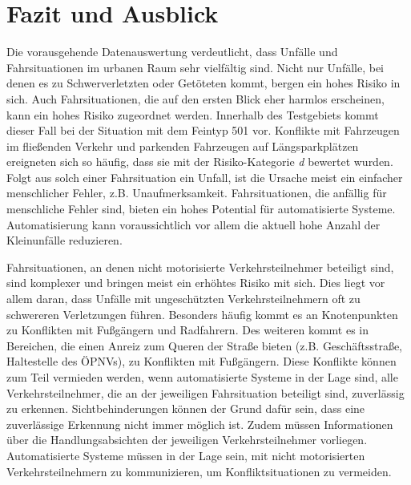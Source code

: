 
\chapter{Fazit und Ausblick}\label{chapter:Diskussion}
Die vorausgehende Datenauswertung verdeutlicht, dass Unfälle und Fahrsituationen im urbanen Raum sehr vielfältig sind. Nicht nur Unfälle, bei denen es zu Schwerverletzten oder Getöteten kommt, bergen ein hohes Risiko in sich. Auch Fahrsituationen, die auf den ersten Blick eher harmlos erscheinen, kann ein hohes Risiko zugeordnet werden. Innerhalb des Testgebiets kommt dieser Fall bei der Situation mit dem Feintyp 501 vor. Konflikte mit Fahrzeugen im fließenden Verkehr und parkenden Fahrzeugen auf Längsparkplätzen ereigneten sich so häufig, dass sie mit der Risiko-Kategorie \textit{d} bewertet wurden. Folgt aus solch einer Fahrsituation ein Unfall, ist die Ursache meist ein einfacher menschlicher Fehler, z.B. Unaufmerksamkeit. Fahrsituationen, die anfällig für menschliche Fehler sind, bieten ein hohes Potential für automatisierte Systeme. Automatisierung kann voraussichtlich vor allem die aktuell hohe Anzahl der Kleinunfälle reduzieren.

Fahrsituationen, an denen nicht motorisierte Verkehrsteilnehmer beteiligt sind, sind komplexer und bringen meist ein erhöhtes Risiko mit sich. Dies liegt vor allem daran, dass Unfälle mit ungeschützten Verkehrsteilnehmern oft zu schwereren Verletzungen führen. Besonders häufig kommt es an Knotenpunkten zu Konflikten mit Fußgängern und Radfahrern. Des weiteren kommt es in Bereichen, die einen Anreiz zum Queren der Straße bieten (z.B. Geschäftsstraße, Haltestelle des ÖPNVs), zu Konflikten mit Fußgängern. Diese Konflikte können zum Teil vermieden werden, wenn automatisierte Systeme in der Lage sind, alle Verkehrsteilnehmer, die an der jeweiligen Fahrsituation beteiligt sind, zuverlässig zu erkennen. Sichtbehinderungen können der Grund dafür sein, dass eine zuverlässige Erkennung nicht immer möglich ist. Zudem müssen Informationen über die Handlungsabsichten der jeweiligen Verkehrsteilnehmer vorliegen. Automatisierte Systeme müssen in der Lage sein, mit nicht motorisierten Verkehrsteilnehmern zu kommunizieren, um Konfliktsituationen zu vermeiden.

